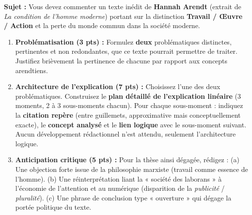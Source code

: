 \documentclass[11pt]{article}
\begin{document}
\begin{exercice}
\textbf{Sujet :} Vous devez commenter un texte inédit de \textbf{Hannah Arendt} (extrait de \textit{La condition de l'homme moderne}) portant sur la distinction \textbf{Travail / Œuvre / Action} et la perte du monde commun dans la société moderne.

\begin{enumerate}
    \item \textbf{Problématisation (3 pts) :} Formulez \textbf{deux} problématiques distinctes, pertinentes et non redondantes, que ce texte pourrait permettre de traiter. Justifiez brièvement la pertinence de chacune par rapport aux concepts arendtiens.
    \item \textbf{Architecture de l'explication (7 pts) :} Choisissez l'une des deux problématiques. Construisez le \textbf{plan détaillé de l'explication linéaire} (3 moments, 2 à 3 sous-moments chacun). Pour chaque sous-moment : indiquez la \textbf{citation repère} (entre guillemets, approximative mais conceptuellement exacte), le \textbf{concept analysé} et le \textbf{lien logique} avec le sous-moment suivant. Aucun développement rédactionnel n'est attendu, seulement l'architecture logique.
    \item \textbf{Anticipation critique (5 pts) :} Pour la thèse ainsi dégagée, rédigez : (a) Une objection forte issue de la philosophie marxiste (travail comme essence de l'homme). (b) Une réinterprétation liant la « société des laborans » à l'économie de l'attention et au numérique (disparition de la \textit{publicité} / \textit{pluralité}). (c) Une phrase de conclusion type « ouverture » qui dégage la portée politique du texte.
\end{enumerate}
\end{exercice}
\end{document}
